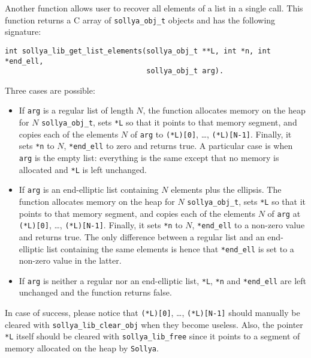 \documentclass[a4paper]{article}
\newcommand{\sollya}{\texttt{Sollya}\xspace}
\begin{document}
Another function allows user to recover all elements of a list in a single call. This function returns a C array of \verb|sollya_obj_t| objects and has the following signature:\\
\begin{center}
\verb|int sollya_lib_get_list_elements(sollya_obj_t **L, int *n, int *end_ell,|\\
\verb|                                 sollya_obj_t arg).                      |
\end{center}
Three cases are possible:
\begin{itemize}
\item If \verb|arg| is a regular list of length $N$, the function allocates memory on the heap for $N$ \verb|sollya_obj_t|, sets \verb|*L| so that it points to that memory segment, and copies each of the elements $N$ of \verb|arg| to \verb|(*L)[0]|, \dots, \verb|(*L)[N-1]|. Finally, it sets \verb|*n| to $N$, \verb|*end_ell| to zero and returns true. A particular case is when \verb|arg| is the empty list: everything is the same except that no memory is allocated and \verb|*L| is left unchanged.
\item If \verb|arg| is an end-elliptic list containing $N$ elements plus the ellipsis. The function allocates memory on the heap for $N$ \verb|sollya_obj_t|, sets \verb|*L| so that it points to that memory segment, and copies each of the elements $N$ of \verb|arg| at \verb|(*L)[0]|, \dots, \verb|(*L)[N-1]|. Finally, it sets \verb|*n| to $N$, \verb|*end_ell| to a non-zero value and returns true. The only difference between a regular list and an end-elliptic list containing the same elements is hence that \verb|*end_ell| is set to a non-zero value in the latter.
\item If \verb|arg| is neither a regular nor an end-elliptic list, \verb|*L|, \verb|*n| and \verb|*end_ell| are left unchanged and the function returns false.
\end{itemize}

In case of success, please notice that \verb|(*L)[0]|, \dots, \verb|(*L)[N-1]| should manually be cleared with \verb|sollya_lib_clear_obj| when they become useless. Also, the pointer \verb|*L| itself should be cleared with \verb|sollya_lib_free| since it points to a segment of memory allocated on the heap by \sollya.
\end{document}
